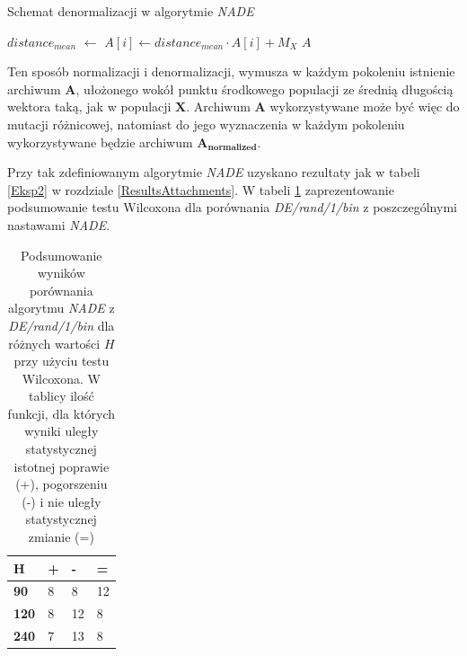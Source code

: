 \documentclass[12pt,a4paper]{report}
\begin{document}
{{{{{{{\begin{algorithm}[H]
\caption{Schemat denormalizacji w algorytmie \emph{NADE}}
\label{algorithm:ea}
\begin{algorithmic}[1]
	\State $distance_{mean}$ $\gets$ 
        \State $A[i] \gets distance_{mean} \cdot A[i] + M_{X}$
    \EndFor
    \State \Return $A$
\EndFunction
\end{algorithmic}
\end{algorithm}
}
\par{
Ten sposób normalizacji i denormalizacji, wymusza w każdym pokoleniu istnienie archiwum $\mathbf{A}$, ułożonego wokół punktu środkowego populacji ze średnią długością wektora taką, jak w populacji $\mathbf{X}$. Archiwum $\mathbf{A}$ wykorzystywane może być więc do mutacji różnicowej, natomiast do jego wyznaczenia w każdym pokoleniu wykorzystywane będzie archiwum $\mathbf{A_{normalized}}$.
}
\par{
Przy tak zdefiniowanym algorytmie \emph{NADE} uzyskano rezultaty jak w tabeli \ref{Eksp2} w rozdziale \ref{ResultsAttachments}. W tabeli \ref{eks2summary} zaprezentowanie podsumowanie testu Wilcoxona dla porównania \emph{DE/rand/1/bin} z poszczególnymi nastawami \emph{NADE}.
\begin{table}[h]
\centering
\caption{Podsumowanie wyników porównania algorytmu \emph{NADE} z \emph{DE/rand/1/bin} dla różnych wartości $H$ przy użyciu testu Wilcoxona. W tablicy ilość funkcji, dla których wyniki uległy statystycznej istotnej poprawie (+), pogorszeniu (-) i nie uległy statystycznej zmianie (=)}
\label{eks2summary}
\begin{tabular}{|l|l|l|l|}
\hline
{\bf H}   & + & -  & =  \\ \hline
{\bf 90}  & 8 & 8  & 12 \\ \hline
{\bf 120} & 8 & 12 & 8  \\ \hline
{\bf 240} & 7 & 13 & 8  \\ \hline
\end{tabular}
\end{table}
}
}}}}}}
\end{document}
